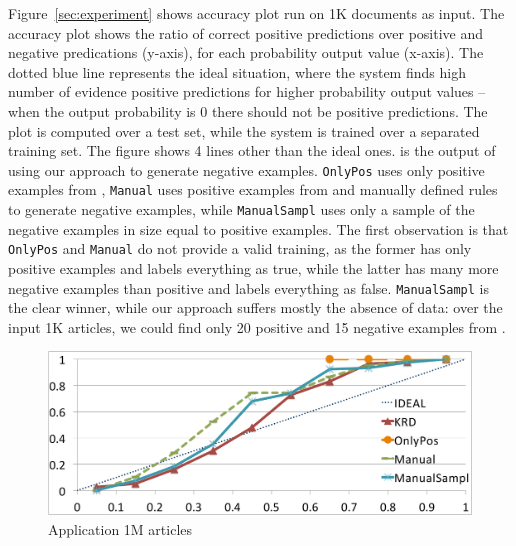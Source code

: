 Figure~\ref{sec:experiment} shows \deepdive accuracy plot run on 1K documents as input. The accuracy plot shows the ratio of correct positive predictions over positive and negative predications (y-axis), for each probability output value (x-axis). The dotted blue line represents the ideal situation, where the system finds high number of evidence positive predictions for higher probability output values -- when the output probability is 0 there should not be positive predictions. The plot is computed over a test set, while the system is trained over a separated training set. The figure shows 4 lines other than the ideal ones. \sys is the output of \deepdive using our approach to generate negative examples. \texttt{OnlyPos} uses only positive examples from \dbpedia, \texttt{Manual} uses positive examples from \dbpedia and manually defined rules to generate negative examples, while \texttt{ManualSampl} uses only a sample of the negative examples in size equal to positive examples. The first observation is that \texttt{OnlyPos} and \texttt{Manual} do not provide a valid training, as the former has only positive examples and labels everything as true, while the latter has many more negative examples than positive and labels everything as false. \texttt{ManualSampl} is the clear winner, while our approach suffers mostly the absence of data: over the input 1K articles, we could find only 20 positive and 15 negative examples from \dbpedia.

\begin{figure}[b]
	\centering
	\includegraphics[width=\columnwidth]{include/figure/deepDive1M.pdf}
	\caption{\deepdive Application 1M articles}
	\label{fig:deep_dive_1M}
\end{figure}

